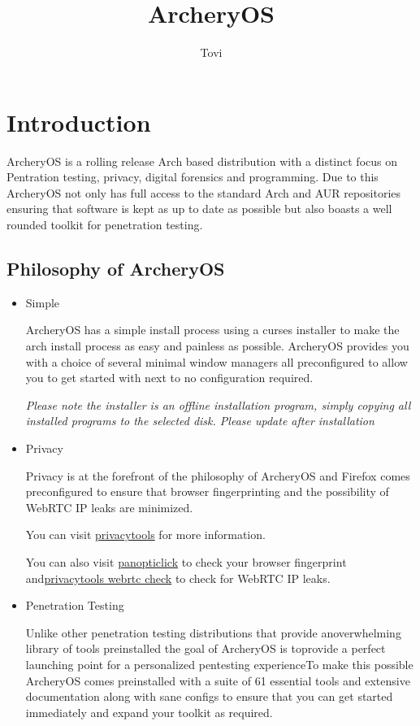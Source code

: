 \documentclass{article}
\author{Tovi}
\title{ArcheryOS}
\begin{document}
\maketitle

\tableofcontents

\pagebreak

\section{Introduction}
ArcheryOS is a rolling release Arch based distribution with a distinct focus on Pentration testing, privacy, digital forensics and programming.
Due to this ArcheryOS not only has full access to the standard Arch and AUR repositories ensuring that software is kept as up to date as possible but also boasts a well rounded toolkit for penetration testing.
\subsection{Philosophy of ArcheryOS}
\begin{itemize}
	\item Simple

		ArcheryOS has a simple install process using a curses installer to make the arch install process as easy and painless as possible. ArcheryOS provides you with a choice of several minimal window managers all preconfigured to allow you to get started with next to no configuration required.

		\emph{Please note the installer is an offline installation program, simply copying all installed programs to the selected disk.  Please update after installation}
	
	\item Privacy

		Privacy is at the forefront of the philosophy of ArcheryOS and Firefox comes preconfigured to ensure that browser fingerprinting and the \newline possibility of WebRTC IP leaks are minimized. 
		
		You can visit \href{https://www.privacytools.io/}{privacytools} for more information.

		You can also visit \href{https://panopticlick.eff.org/}{panopticlick} to check your browser fingerprint and\newline \href{https://www.privacytools.io/webrtc.html}{privacytools webrtc check} to check for WebRTC IP leaks.
	
	\item Penetration Testing

		Unlike other penetration testing distributions that provide an\newline overwhelming library of tools preinstalled the goal of ArcheryOS is to\newline provide a perfect launching point for a personalized pentesting experience\newline To make this possible ArcheryOS comes preinstalled with a suite of 61 essential tools and extensive documentation along with sane configs to ensure that you can get started immediately and expand your toolkit as required.
\end{itemize}
\end{document}
